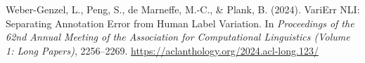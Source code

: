 \begin{description}[leftmargin=1.6em,style=unboxed,itemsep=0.3em]
\item Weber-Genzel, L., Peng, S., de Marneffe, M.-C., \& Plank, B. (2024). VariErr NLI:
Separating Annotation Error from Human Label Variation. In \emph{Proceedings of the 62nd Annual
Meeting of the Association for Computational Linguistics (Volume 1: Long Papers)}, 2256--2269.
\url{https://aclanthology.org/2024.acl-long.123/}

\end{description}

